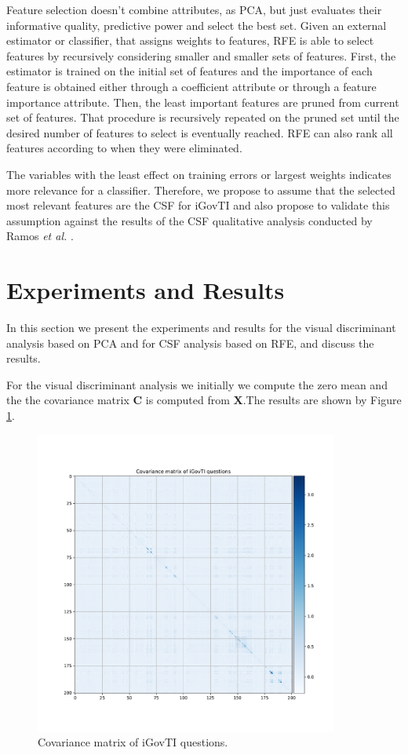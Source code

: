 Feature selection doesn't combine attributes, as PCA, but just evaluates their informative quality, predictive power and select the best set. Given an external estimator or classifier, that assigns weights to features, RFE is able to select features by recursively considering smaller and smaller sets of features. First, the estimator is trained on the initial set of features and the importance of each feature is obtained either through a coefficient attribute or through a feature importance attribute. Then, the least important features are pruned from current set of features. That procedure is recursively repeated on the pruned set until the desired number of features to select is eventually reached. RFE can also rank all features according to when they were eliminated. 

The variables with the least effect on training errors or largest weights indicates more relevance for a classifier. Therefore, we propose to assume that the selected most relevant features are the CSF for iGovTI and also propose to validate this assumption against the results of the CSF qualitative analysis conducted by Ramos \emph{et al.} .


\section{Experiments and Results}
\label{sec:b_experimentalresults}

In this section we present the experiments and results for the visual discriminant analysis based on PCA and for CSF analysis based on RFE, and discuss the results.

For the visual discriminant analysis we initially we compute the zero mean and the the covariance matrix $\mathbf{C}$ is computed from $\mathbf{X}$.The results are shown by Figure \ref{fig:b_fig1}.
 
\begin{figure}[h!]
     \centering 
     \includegraphics[height=10cm, width=10cm]{figures/apx_b/raw_igovti_covariance-eps-converted-to.pdf}
     \caption{Covariance matrix of iGovTI questions.}
     \label{fig:b_fig1}
\end{figure}

